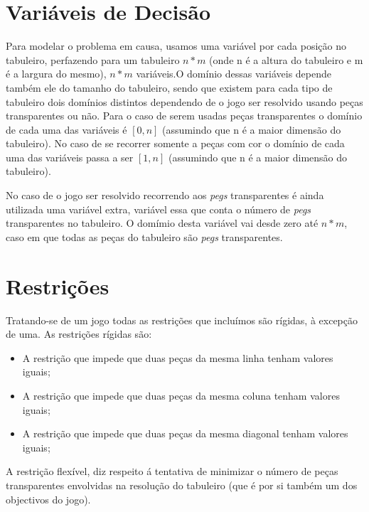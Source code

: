 \documentclass{llncs}
\begin{document}
\section{Vari\'{a}veis de Decis\~{a}o}

Para modelar o problema em causa, usamos uma vari\'{a}vel por cada posi\c{c}\~{a}o no tabuleiro, perfazendo para um tabuleiro $n * m$ (onde n \'{e} a altura do tabuleiro e m \'{e} a largura do mesmo), $n * m$ vari\'{a}veis.O dom\'{i}nio dessas vari\'{a}veis depende tamb\'{e}m ele do tamanho do tabuleiro, sendo que existem para cada tipo de tabuleiro dois dom\'{i}nios distintos dependendo de o jogo ser resolvido usando pe\c{c}as transparentes ou n\~{a}o.
Para o caso de serem usadas pe\c{c}as transparentes o dom\'{i}nio de cada uma das vari\'{a}veis \'{e} $[0,n]$ (assumindo que n \'{e} a maior dimens\~{a}o do tabuleiro).
No caso de se recorrer somente a pe\c{c}as com cor o dom\'{i}nio de cada uma das vari\'{a}veis passa a ser $[1,n]$ (assumindo que n \'{e} a maior dimens\~{a}o do tabuleiro).

No caso de o jogo ser resolvido recorrendo aos \emph{pegs} transparentes \'{e} ainda utilizada uma vari\'{a}vel extra, vari\'{a}vel essa que conta o n\'{u}mero de \emph{pegs} transparentes no tabuleiro. O dom\'{i}mio desta vari\'{a}vel vai desde zero at\'{e} $n*m$, caso em que todas as pe\c{c}as do tabuleiro s\~{a}o \emph{pegs} transparentes.

\section{Restri\c{c}\~{o}es}

Tratando-se de um jogo todas as restri\c{c}\~{o}es que inclu\'{i}mos s\~{a}o r\'{i}gidas, \`{a} excep\c{c}\~{a}o de uma.
As restri\c{c}\~{o}es r\'{i}gidas s\~{a}o:

\begin{itemize}
\item A restri\c{c}\~{a}o que impede que duas pe\c{c}as da mesma linha tenham valores iguais;
\item A restri\c{c}\~{a}o que impede que duas pe\c{c}as da mesma coluna tenham valores iguais;
\item A restri\c{c}\~{a}o que impede que duas pe\c{c}as da mesma diagonal tenham valores iguais;
\end{itemize}

A restri\c{c}\~{a}o flex\'{i}vel, diz respeito \'{a} tentativa de minimizar o n\'{u}mero de pe\c{c}as transparentes envolvidas na resolu\c{c}\~{a}o do tabuleiro (que \'{e} por si tamb\'{e}m um dos objectivos do jogo).
\end{document}
